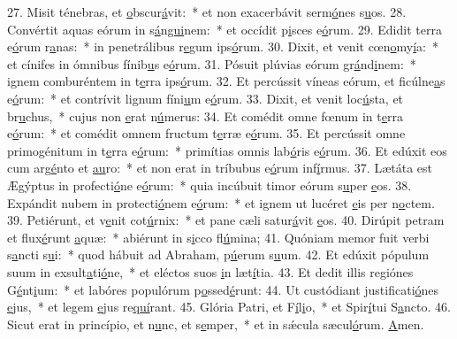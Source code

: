 27. Misit ténebras, et \uline{o}bscur\uline{á}vit:~* et non exacerbávit serm\uline{ó}nes s\uline{u}os.
28. Convértit aquas eórum in s\uline{á}n\uline{gui}nem:~* et occídit p\uline{i}sces e\uline{ó}rum.
29. Edidit terra e\uline{ó}rum r\uline{a}nas:~* in penetrálibus r\uline{e}gum ips\uline{ó}rum.
30. Dixit, et venit cœn\uline{o}my\uline{í}a:~* et cínifes in ómnibus fínib\uline{u}s e\uline{ó}rum.
31. Pósuit plúvias eórum gr\uline{á}nd\uline{i}nem:~* ignem comburéntem in t\uline{e}rra ips\uline{ó}rum.
32. Et percússit víneas eórum, et ficúlne\uline{a}s e\uline{ó}rum:~* et contrívit lignum fíni\uline{u}m e\uline{ó}rum.
33. Dixit, et venit loc\uline{ú}sta, et br\uline{u}chus,~* cujus non \uline{e}rat n\uline{ú}merus:
34. Et comédit omne fœnum in t\uline{e}rra e\uline{ó}rum:~* et comédit omnem fructum t\uline{e}rræ e\uline{ó}rum.
35. Et percússit omne primogénitum in t\uline{e}rra e\uline{ó}rum:~* primítias omnis lab\uline{ó}ris e\uline{ó}rum.
36. Et edúxit eos cum arg\uline{é}nto et \uline{au}ro:~* et non erat in tríbubus e\uline{ó}rum inf\uline{í}rmus.
37. Lætáta est Ægýptus in profecti\uline{ó}ne e\uline{ó}rum:~* quia incúbuit timor eórum s\uline{u}per \uline{e}os.
38. Expándit nubem in protecti\uline{ó}nem e\uline{ó}rum:~* et ignem ut lucéret \uline{e}is per n\uline{o}ctem.
39. Petiérunt, et v\uline{e}nit cot\uline{ú}rnix:~* et pane cæli satur\uline{á}vit \uline{e}os.
40. Dirúpit petram et flux\uline{é}runt \uline{a}quæ:~* abiérunt in s\uline{i}cco fl\uline{ú}mina;
41. Quóniam memor fuit verbi s\uline{a}ncti s\uline{u}i:~* quod hábuit ad Abraham, p\uline{ú}erum s\uline{u}um.
42. Et edúxit pópulum suum in exsult\uline{a}ti\uline{ó}ne,~* et eléctos suos \uline{i}n læt\uline{í}tia.
43. Et dedit illis regiónes G\uline{é}nt\uline{i}um:~* et labóres populórum p\uline{o}ssed\uline{é}runt:
44. Ut custódiant justificati\uline{ó}nes \uline{e}jus,~* et legem \uline{e}jus re\uline{quí}rant.
45. Glória Patri, et F\uline{í}l\uline{i}o,~* et Spir\uline{í}tui S\uline{a}ncto.
46. Sicut erat in princípio, et n\uline{u}nc, et s\uline{e}mper,~* et in sǽcula sæcul\uline{ó}rum. \uline{A}men.
